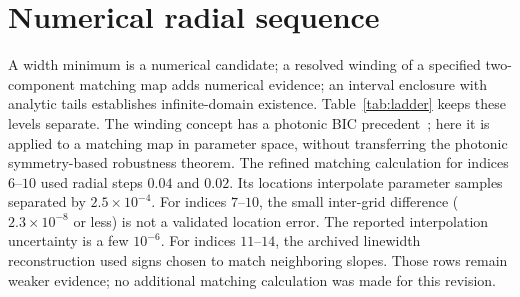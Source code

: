 \section{Numerical radial sequence}\label{sec:sequence}
A width minimum is a numerical candidate; a resolved winding of a
specified two-component matching map adds numerical evidence; an
interval enclosure with analytic tails establishes infinite-domain
existence. Table~\ref{tab:ladder} keeps these levels separate.
The winding concept has a photonic BIC precedent~\cite{Zhen2014}; here
it is applied to a matching map in parameter space, without transferring
the photonic symmetry-based robustness theorem.
The refined matching calculation for indices $6$--$10$ used radial
steps $0.04$ and $0.02$. Its locations interpolate parameter samples
separated by $2.5\times10^{-4}$. For indices $7$--$10$, the small
inter-grid difference ($2.3\times10^{-8}$ or less) is not a validated location error.
The reported interpolation uncertainty is a few $10^{-6}$.
For indices $11$--$14$, the archived linewidth reconstruction used signs
chosen to match neighboring slopes. Those rows remain weaker evidence;
no additional matching calculation was made for this revision.

